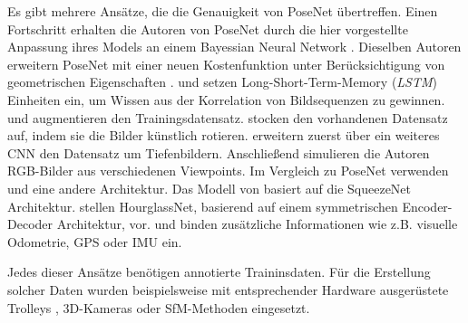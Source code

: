 Es gibt mehrere Ansätze, die die Genauigkeit von PoseNet übertreffen.
Einen Fortschritt erhalten die Autoren von PoseNet durch die hier \cite{kendallModellingUncertaintyDeep2015a} vorgestellte Anpassung ihres Models an einem Bayessian Neural Network \cite{denkerTransformingNeuralNetOutput1991, mackayPracticalBayesianFramework1991}.
Dieselben Autoren erweitern PoseNet mit einer neuen Kostenfunktion unter Berücksichtigung von geometrischen Eigenschaften \cite{kendallGeometricLossFunctions2017}. \citet{walchImagebasedLocalizationUsing2016} und \citet{clarkVidLocDeepSpatioTemporal2017} setzen Long-Short-Term-Memory (\textit{LSTM}) \cite{hochreiterLongShortTermMemory1997a} Einheiten ein, um Wissen aus der Korrelation von Bildsequenzen zu gewinnen. \citet{wuDelvingDeeperConvolutional2017} und \citet{naseerDeepRegressionMonocular2017} augmentieren den Trainingsdatensatz. \citet{wuDelvingDeeperConvolutional2017} stocken den vorhandenen Datensatz auf, indem sie die Bilder künstlich rotieren. \citet{naseerDeepRegressionMonocular2017} erweitern zuerst über ein weiteres CNN den Datensatz um Tiefenbildern. Anschließend simulieren die Autoren RGB-Bilder aus verschiedenen Viewpoints. Im Vergleich zu PoseNet verwenden \citet{mullerSQUEEZEPOSENETIMAGEBASED2017} und \citet{melekhovImageBasedLocalizationUsing2017} eine andere Architektur. 
Das Modell von \citet{mullerSQUEEZEPOSENETIMAGEBASED2017} basiert auf die SqueezeNet \cite{iandolaSqueezeNetAlexNetlevelAccuracy2016} Architektur. \citet{melekhovImageBasedLocalizationUsing2017} stellen HourglassNet, basierend auf einem symmetrischen Encoder-Decoder Architektur, vor. \citet{brahmbhattGeometryAwareLearningMaps2018} und \citet{valadaDeepAuxiliaryLearning2018, valadaIncorporatingSemanticGeometric} binden zusätzliche Informationen wie z.B. visuelle Odometrie, GPS oder IMU ein. 

Jedes dieser Ansätze benötigen annotierte Traininsdaten. Für die Erstellung solcher Daten wurden beispielsweise mit entsprechender Hardware ausgerüstete Trolleys \cite{huitlTUMindoorExtensiveImage2012}, 3D-Kameras \cite{izadiKinectFusionRealtime3D2011} oder SfM-Methoden \cite{kendallPoseNetConvolutionalNetwork2015} eingesetzt.

